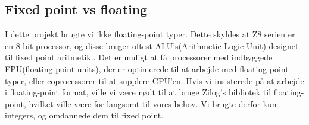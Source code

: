 \subsection{Fixed point vs floating}
I dette projekt brugte vi ikke floating-point typer. Dette skyldes at Z8 serien er en 8-bit processor, og disse bruger oftest ALU's(Arithmetic Logic Unit) designet til fixed point aritmetik.\cite[s. ~5]{Zicomp}. Det er muligt at få processorer med indbyggede FPU(floating-point units), der er optimerede til at arbejde med floating-point typer, eller coprocessorer til at supplere CPU'en. Hvis vi insisterede på at arbejde i floating-point format, ville vi være nødt til at bruge Zilog's bibliotek til floating-point, hvilket ville være for langsomt til vores behov\cite{Zifloat}\cite{Zimult}. Vi brugte derfor kun integers, og omdannede dem til fixed point.
